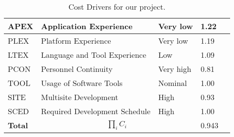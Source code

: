 \begin{table}[h]
\begin{tabular}{| l | l | l | l | l |}
        \hline
        APEX            & Application Experience                    & Very low             & 1.22              \\
        \hline
        PLEX            & Platform Experience                       & Very low             & 1.19              \\
        \hline
        LTEX            & Language and Tool Experience              & Low                  & 1.09              \\
        \hline
        PCON            & Personnel Continuity                      & Very high            & 0.81              \\
        \hline
        TOOL            & Usage of Software Tools                   & Nominal              & 1.00              \\
        \hline
        SITE            & Multisite Development                     & High                 & 0.93              \\
        \hline
        SCED            & Required Development Schedule             & High                 & 1.00              \\
        \hline
        \textbf{Total}  & \multicolumn{2}{|c|}{$\prod_i C_i$}                              & 0.943             \\
        \hline
    \end{tabular}
    \caption{Cost Drivers for our project.}
    \label{tab:cost-drivers}
\end{table}
